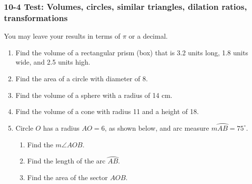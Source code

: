 \documentclass[12pt, twoside]{article}
\begin{document}
\subsubsection*{10-4 Test: Volumes, circles, similar triangles, dilation ratios, transformations}
You may leave your results in terms of $\pi$ or a decimal.

 \begin{enumerate}

      \item Find the volume of a rectangular prism (box) that is 3.2 units long, 1.8 units wide, and 2.5 units high. \vspace{1.5cm}
      \item Find the area of a circle with diameter of 8. \vspace{1.5cm}
      \item Find the volume of a sphere with a radius of 14 cm. \vspace{1.5cm}
      \item Find the volume of a cone with radius 11 and a height of 18. \vspace{1.5cm}

      \item Circle $O$ has a radius $AO=6$, as shown below, and arc measure $m \wideparen{AB}=75^\circ$.
            \begin{center}
          \end{center}
          \begin{enumerate}
            \item Find the $m \angle AOB$. \vspace{1.5cm}
            \item Find the length of the arc $\wideparen{AB}$. \vspace{1.5cm}
            \item Find the area of the sector $AOB$. %
          \end{enumerate}
\newpage


\end{enumerate}
\end{document}
